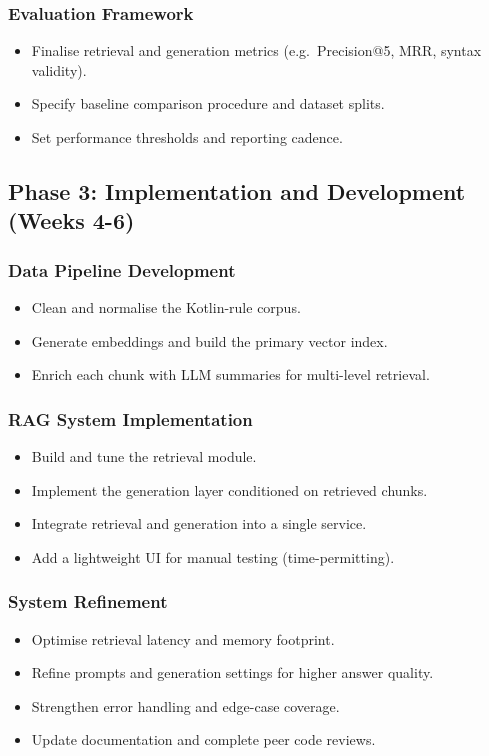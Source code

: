 \documentclass[11pt,a4paper]{article}
\begin{document}
\subsubsection{Evaluation Framework}
\begin{itemize}[leftmargin=2em]
      \item Finalise retrieval and generation metrics (e.g.\ Precision@5, MRR, syntax validity).
      \item Specify baseline comparison procedure and dataset splits.
      \item Set performance thresholds and reporting cadence.    
\end{itemize}

\subsection{Phase 3: Implementation and Development (Weeks 4-6)}
\subsubsection{Data Pipeline Development}
\begin{itemize}[leftmargin=2em]
  \item Clean and normalise the Kotlin-rule corpus.
  \item Generate embeddings and build the primary vector index.
  \item Enrich each chunk with LLM summaries for multi-level retrieval.
\end{itemize}

\subsubsection{RAG System Implementation}
\begin{itemize}[leftmargin=2em]
  \item Build and tune the retrieval module.
  \item Implement the generation layer conditioned on retrieved chunks.
  \item Integrate retrieval and generation into a single service.
  \item Add a lightweight UI for manual testing (time-permitting).
\end{itemize}


\subsubsection{System Refinement}
\begin{itemize}[leftmargin=2em]
  \item Optimise retrieval latency and memory footprint.
  \item Refine prompts and generation settings for higher answer quality.
  \item Strengthen error handling and edge-case coverage.
  \item Update documentation and complete peer code reviews.
\end{itemize}
\end{document}
